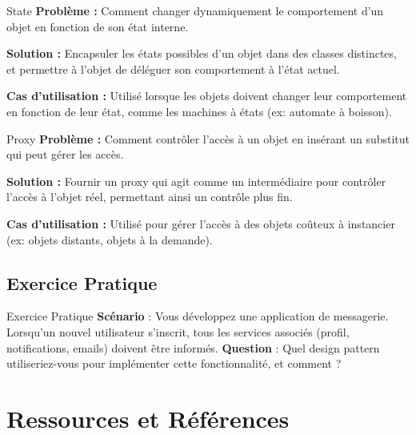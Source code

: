 \documentclass[aspectratio=169]{beamer}
\begin{document}
\begin{frame}{State}
    \textbf{Problème :} 
    Comment changer dynamiquement le comportement d'un objet en fonction de son état interne.

    \textbf{Solution :} 
    Encapsuler les états possibles d'un objet dans des classes distinctes, et permettre à l'objet de déléguer son comportement à l'état actuel.

    \textbf{Cas d'utilisation :}
    Utilisé lorsque les objets doivent changer leur comportement en fonction de leur état, comme les machines à états (ex: automate à boisson).
\end{frame}

\begin{frame}{Proxy}
    \textbf{Problème :} 
    Comment contrôler l'accès à un objet en insérant un substitut qui peut gérer les accès.

    \textbf{Solution :} 
    Fournir un proxy qui agit comme un intermédiaire pour contrôler l'accès à l'objet réel, permettant ainsi un contrôle plus fin.

    \textbf{Cas d'utilisation :}
    Utilisé pour gérer l'accès à des objets coûteux à instancier (ex: objets distants, objets à la demande).
\end{frame}

\subsection{Exercice Pratique}

\begin{frame}{Exercice Pratique}
    \textbf{Scénario} : Vous développez une application de messagerie. Lorsqu'un nouvel utilisateur s'inscrit, tous les services associés (profil, notifications, emails) doivent être informés.
    \vspace{0.5cm}
    \textbf{Question} : Quel design pattern utiliseriez-vous pour implémenter cette fonctionnalité, et comment ?
    \vspace{0.5cm}   
\end{frame}


\section{Ressources et Références}
\end{document}
